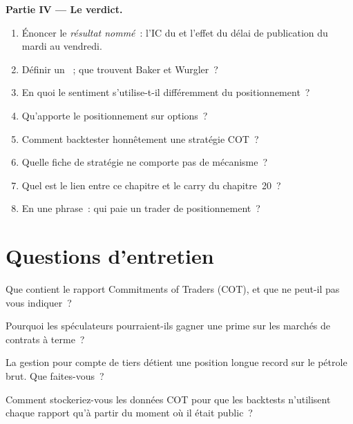 \begin{problem}
\medskip\noindent\textbf{Partie IV --- Le verdict.}
\begin{enumerate}[resume]
\item Énoncer le \emph{résultat nommé}~: l'IC du  et l'effet du délai de publication du mardi au vendredi.
\item Définir un ~; que trouvent Baker et Wurgler~?
\item En quoi le sentiment s'utilise-t-il différemment du positionnement~?
\item Qu'apporte le positionnement sur options~?
\item Comment backtester honnêtement une stratégie COT~?
\item Quelle fiche de stratégie ne comporte pas de mécanisme~?
\item Quel est le lien entre ce chapitre et le carry du chapitre~20~?
\item En une phrase~: qui paie un trader de positionnement~?
\end{enumerate}
\end{problem}

\section{Questions d'entretien}

\begin{interviewq}\label{iq:s1:positioning-and-sentiment:1}
Que contient le rapport Commitments of Traders (COT), et que ne peut-il pas vous indiquer~?
\end{interviewq}

\begin{interviewq}\label{iq:s1:positioning-and-sentiment:2}
Pourquoi les spéculateurs pourraient-ils gagner une prime sur les marchés de contrats à terme~?
\end{interviewq}

\begin{interviewq}\label{iq:s1:positioning-and-sentiment:3}
La gestion pour compte de tiers détient une position longue record sur le pétrole brut. Que faites-vous~?
\end{interviewq}

\begin{interviewq}\label{iq:s1:positioning-and-sentiment:4}
Comment stockeriez-vous les données COT pour que les backtests n'utilisent chaque rapport qu'à partir du moment où il était public~?
\end{interviewq}

